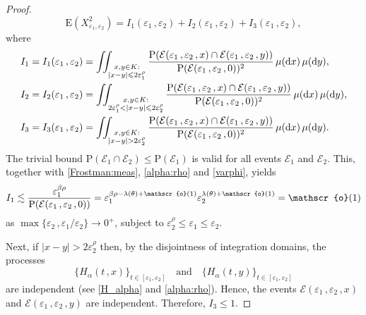 \documentclass[reqno]{amsart}
\newcommand{\<}{\langle}
\renewcommand{\>}{\rangle}
\renewcommand{\P}{\mathrm{P}}
\newcommand{\E}{\mathrm{E}}
\newcommand{\1}{\mathbb{1}}
\renewcommand{\d}{{\rm d}}
\renewcommand{\le}{\leqslant}
\theoremstyle{definition}
\numberwithin{equation}{section}
\begin{document}
\begin{proof}
	\[
		\E(X_{\varepsilon_1,\varepsilon_2}^2)
		= I_1(\varepsilon_1\,,\varepsilon_2)
		+I_2(\varepsilon_1\,,\varepsilon_2)
		+I_3(\varepsilon_1\,,\varepsilon_2),
	\]
	where
	\begin{align*}
		&I_1 = I_1(\varepsilon_1\,,\varepsilon_2) = 
			\iint_{\substack{x,y \in K:\\|x-y|\le 2\varepsilon_1^\rho}} 
			\frac{\P(\mathcal{E}(\varepsilon_1\,,\varepsilon_2\,,x) \cap 
			\mathcal{E}(\varepsilon_1\,,\varepsilon_2\,,y))}{%
			\P(\mathcal{E}(\varepsilon_1\,,\varepsilon_2\,,0))^2}\, 
			\mu(\d x)\, \mu(\d y),\\
		&I_2 = I_2(\varepsilon_1\,,\varepsilon_2) = 
			\iint_{\substack{x,y \in K:\\ 2\varepsilon_1^\rho < |x-y|\le 
			2\varepsilon_2^\rho}} \frac{\P(\mathcal{E}(\varepsilon_1\,,\varepsilon_2\,,x)
			\cap \mathcal{E}(\varepsilon_1\,,\varepsilon_2\,,y))}{%
			\P(\mathcal{E}(\varepsilon_1\,,\varepsilon_2\,,0))^2}\, \mu(\d x)\, \mu(\d y),\\
		&I_3 = I_3(\varepsilon_1\,,\varepsilon_2) = \iint_{%
			\substack{x,y \in K:\\|x-y|>2\varepsilon_2^\rho}} 
			\frac{\P(\mathcal{E}(\varepsilon_1\,,\varepsilon_2\,,x) 
			\cap \mathcal{E}(\varepsilon_1\,,\varepsilon_2\,,y))}{%
			\P(\mathcal{E}(\varepsilon_1\,,\varepsilon_2\,,0))^2}\, \mu(\d x)\, \mu(\d y).
	\end{align*}
	The trivial bound $\P(\mathcal{E}_1\cap\mathcal{E}_2) \le \P(\mathcal{E}_1)$ 
	is valid for all events $\mathcal{E}_1$ and $\mathcal{E}_2$. 
	This, together with \eqref{Frostman:meas}, \eqref{alpha:rho} and \eqref{varphi},  yields
	\[
		I_1 \lesssim \frac{\varepsilon_1^{\beta\rho}}{\P(\mathcal{E}(
		\varepsilon_1\,,\varepsilon_2\,,0))} = \varepsilon_1^{%
		\beta\rho-\lambda(\theta)+\mathscr{o}(1)} \varepsilon_2^{\lambda(\theta)
		+\mathscr{o}(1)} = \mathscr{o}(1)
	\]
	as $\max\{\varepsilon_2\,,\varepsilon_1/\varepsilon_2\} 
	\to 0^+$, subject to $\varepsilon_2^\rho \le \varepsilon_1 \le \varepsilon_2$.
	
	Next, if $|x-y|>2\varepsilon_2^\rho$ then,
	by the disjointness of integration domains, the processes
	\[
		\{ H_\alpha(t\,,x) \}_{t \in [\varepsilon_1,\varepsilon_2]} \quad \text{and} \quad
		\{ H_\alpha(t\,,y) \}_{t \in [\varepsilon_1,\varepsilon_2]}
	\]
	are independent (see \eqref{H_alpha} and \eqref{alpha:rho}).
	Hence, the events
	$\mathcal{E}(\varepsilon_1\,,\varepsilon_2\,,x)$
	and $\mathcal{E}(\varepsilon_1\,,\varepsilon_2\,,y)$ are independent. Therefore, $I_3 \le 1$.
	

\end{proof}
\end{document}
